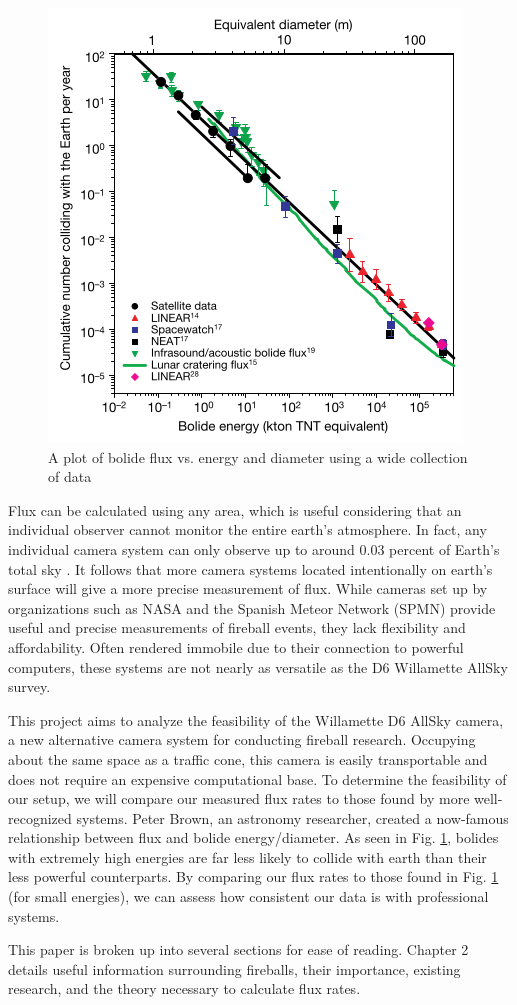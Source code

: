 \begin{figure}[ht!]
  \centering
  \includegraphics[scale=0.7]{images/flux_brown.png}
  \caption{A plot of bolide flux vs. energy and diameter using a wide collection of data}
  \label{brown}
\end{figure}


Flux can be calculated using any area, which is useful considering that an individual observer cannot monitor the entire earth's atmosphere.
In fact, any individual camera system can only observe up to around 0.03 percent of Earth’s total sky \cite{russell_photometry_2018}.
It follows that more camera systems located intentionally on earth's surface will give a more precise measurement of flux.  
While cameras set up by organizations such as NASA and the Spanish Meteor Network (SPMN) provide useful and precise measurements of fireball events, they lack flexibility and affordability.  
Often rendered immobile due to their connection to powerful computers, these systems are not nearly as versatile as the D6 Willamette AllSky survey. 

This project aims to analyze the feasibility of the Willamette D6 AllSky camera, a new alternative camera system for conducting fireball research. 
Occupying about the same space as a traffic cone, this camera is easily transportable and does not require an expensive computational base.
To determine the feasibility of our setup, we will compare our measured flux rates to those found by more well-recognized systems.
Peter Brown, an astronomy researcher, created a now-famous relationship between flux and bolide energy/diameter. 
As seen in Fig. \ref{brown}, bolides with extremely high energies are far less likely to collide with earth than their less powerful counterparts.
By comparing our flux rates to those found in Fig. \ref{brown} (for small energies), we can assess how consistent our data is with professional systems.

This paper is broken up into several sections for ease of reading. Chapter 2 details useful information surrounding fireballs, their importance, existing research, and the theory necessary to calculate flux rates.
